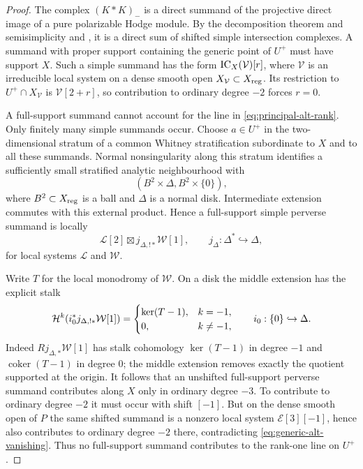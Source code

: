 
\begin{proof}
The complex $(K*K)_-$ is a direct summand of the projective direct image of
a pure polarizable Hodge module.  By the decomposition theorem and
semisimplicity \cite[Th\'eor\`eme~6.2.5]{BBD1982} and
\cite[Th\'eor\`eme~5.3.1]{Saito1988}, it is a direct sum of shifted simple
intersection complexes.  A summand with proper support containing the
generic point of $U^+$ must have support $X$.  Such a simple summand has the
form $\operatorname{IC}_X(\mathcal V)[r]$, where $\mathcal V$ is an irreducible local
system on a dense smooth open $X_{\mathcal V}\subset X_{\mathrm{reg}}$.  Its
restriction to $U^+\cap X_{\mathcal V}$ is $\mathcal V[2+r]$, so contribution
to ordinary degree $-2$ forces $r=0$.

A full-support summand cannot account for the line in
\eqref{eq:principal-alt-rank}.  Only finitely many simple summands occur.
Choose $a\in U^+$ in the two-dimensional stratum of a common Whitney
stratification subordinate to $X$ and to all these summands.  Normal
nonsingularity along this stratum identifies a sufficiently small
stratified analytic neighbourhood with
\[
 (B^2\times\Delta,B^2\times\{0\}),
\]
where $B^2\subset X_{\mathrm{reg}}$ is a ball and $\Delta$ is a normal disk.
Intermediate extension commutes with this external product.  Hence a
full-support simple perverse summand is locally
\[
 \mathcal L[2]\boxtimes j_{\Delta,!*}\mathcal W[1],
 \qquad j_\Delta:\Delta^*\hookrightarrow\Delta,
\]
for local systems $\mathcal L$ and $\mathcal W$.

Write $T$ for the local monodromy of $\mathcal W$.  On a disk the middle
extension has the explicit stalk
\[
 \mathcal H^k\!\left(i_0^*j_{\Delta,!*}\mathcal W[1]\right)
 =\begin{cases}
   \ker(T-1),&k=-1,\\
   0,&k\ne-1,
  \end{cases}
 \qquad i_0:\{0\}\hookrightarrow\Delta.
\]
Indeed $Rj_{\Delta,*}\mathcal W[1]$ has stalk cohomology
$\ker(T-1)$ in degree $-1$ and $\operatorname{coker}(T-1)$ in degree $0$;
the middle extension removes exactly the quotient supported at the origin.
It follows that an unshifted full-support perverse summand contributes along
$X$ only in ordinary degree $-3$.  To contribute to ordinary degree $-2$
it must occur with shift $[-1]$.  But on the dense smooth open of $P$ the
same shifted summand is a nonzero local system $\mathcal E[3][-1]$, hence
also contributes to ordinary degree $-2$ there, contradicting
\eqref{eq:generic-alt-vanishing}.  Thus no full-support summand contributes
to the rank-one line on $U^+$.


\end{proof}
